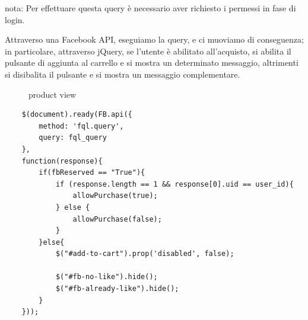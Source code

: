 nota: Per effettuare questa query è necessario aver richiesto i permessi in fase di login. 

Attraverso una Facebook API, eseguiamo la query, e ci muoviamo di conseguenza; in particolare, attraverso jQuery, se l'utente è abilitato all'acquisto, si abilita il pulsante di aggiunta al carrello e si mostra un determinato messaggio, altrimenti si disibalita il pulsante e si mostra un messaggio complementare.
\begin{figure}
\centering
{}
\hspace{5mm}
\caption{product view}
\end{figure}
\begin{lstlisting}
    $(document).ready(FB.api({
        method: 'fql.query',
        query: fql_query
    },
    function(response){
        if(fbReserved == "True"){
            if (response.length == 1 && response[0].uid == user_id){
                allowPurchase(true);
            } else {
                allowPurchase(false);
            }
        }else{
            $("#add-to-cart").prop('disabled', false);

            $("#fb-no-like").hide();
            $("#fb-already-like").hide();
        }
    }));
\end{lstlisting}
\newpage
